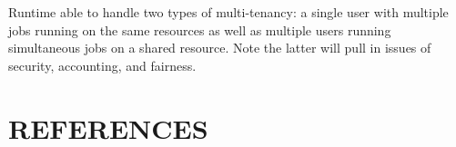\documentclass[11pt]{article}
\begin{document}


Runtime able to handle two types of multi-tenancy:  a single user with multiple
jobs running on the same resources as well as multiple users running simultaneous
jobs on a shared resource.  Note the latter will pull in issues of security,
accounting, and fairness.



\begingroup
\section{REFERENCES}
\printbibliography[heading=none]
\endgroup
\end{document}
